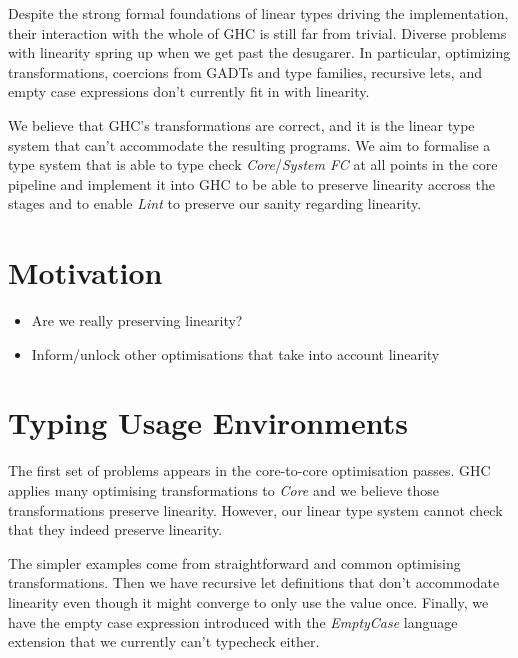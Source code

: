 \documentclass[10pt, a4paper, draft]{article}
\begin{document}
Despite the strong formal foundations of linear types driving the
implementation, their interaction with the whole of GHC is still far from
trivial. Diverse problems with linearity spring up when we get past the
desugarer. In particular, optimizing transformations, coercions from GADTs and
type families, recursive lets, and empty case expressions don't currently fit in
with linearity.

We believe that GHC's transformations are correct, and it is the linear type
system that can't accommodate the resulting programs. We aim to formalise a type
system that is able to type check \emph{Core}/\emph{System FC} at all points in
the core pipeline and implement it into GHC to be able to preserve linearity
accross the stages and to enable \emph{Lint} to preserve our sanity regarding
linearity.

\section{Motivation}

\begin{itemize}
    \item Are we really preserving linearity?
    \item Inform/unlock other optimisations that take into account linearity
\end{itemize}


\section{Typing Usage Environments}

The first set of problems appears in the core-to-core optimisation passes. GHC
applies many optimising transformations to \emph{Core} and we believe those
transformations preserve linearity. However, our linear type system cannot check
that they indeed preserve linearity.

The simpler examples come from straightforward and common optimising
transformations. Then we have recursive let definitions that don't accommodate
linearity even though it might converge to only use the value once. Finally, we
have the empty case expression introduced with the \emph{EmptyCase} language
extension that we currently can't typecheck either.
\end{document}
